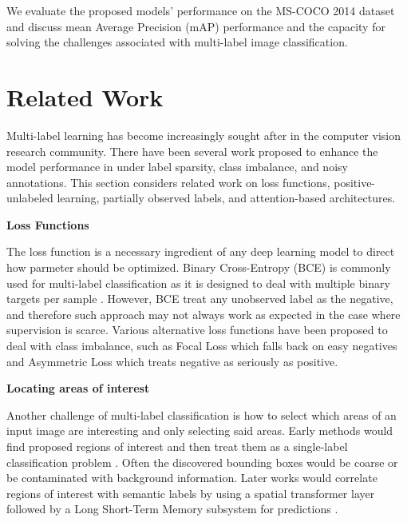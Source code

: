 \documentclass[lettersize,journal]{IEEEtran}
\renewcommand{\paragraph}[1]{%
  \vspace{1.5ex}\textbf{#1}\quad
}
\begin{document}
We evaluate the proposed models' performance on the MS-COCO 2014 dataset and discuss mean Average Precision (mAP) performance and the capacity for solving the challenges associated with multi-label image classification.

\section{Related Work}
Multi-label learning has become increasingly sought after in the computer vision research community. There have been several work proposed to enhance the model performance in under label sparsity, class imbalance, and noisy annotations. This section considers related work on loss functions, positive-unlabeled learning, partially observed labels, and attention-based architectures.


\paragraph{Loss Functions}
The loss function is a necessary ingredient of any deep learning model to direct how parmeter should be optimized. Binary Cross-Entropy (BCE) is commonly used for multi-label classification as it is designed to deal with multiple binary targets per sample \cite{mlsp,durand2019learningdeepconvnetmultilabel}. However, BCE treat any unobserved label as the negative, and therefore such approach may not always work as expected in the case where supervision is scarce. Various alternative loss functions have been proposed to deal with class imbalance, such as Focal Loss  which falls back on easy negatives and Asymmetric Loss which treats negative as seriously as positive.

\paragraph{Locating areas of interest}
Another challenge of multi-label classification is how to select which areas of an input image are interesting and only selecting said areas. Early methods would find proposed regions of interest and then treat them as a single-label classification problem \cite{HCP}. Often the discovered bounding boxes would be coarse or be contaminated with background information. Later works would correlate regions of interest with semantic labels by using a spatial transformer layer followed by a Long Short-Term Memory subsystem for predictions \cite{ltsm}.
\end{document}
